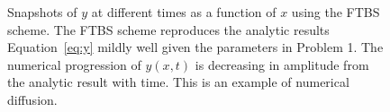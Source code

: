 \documentclass{article}
\begin{document}
\begin{homeworkProblem}
\begin{figure}[!ht]
\begin{center}
        \caption{\label{fig:q2_ftbs}Snapshots of $y$ at different times as a
        function of $x$ using the FTBS scheme. The FTBS scheme reproduces the
        analytic results Equation~\ref{eq:y} mildly well given the parameters
        in Problem 1. The numerical progression of $y(x,t)$ is decreasing in
        amplitude from the analytic result with time. This is an example of
        numerical diffusion.}

    \end{center}
    \end{figure}


\end{homeworkProblem}
\clearpage
\end{document}
